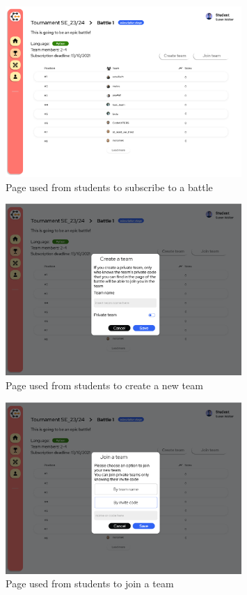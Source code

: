 \begin{figure}[H]
    \centering
    \includegraphics[width=0.8\textwidth]{Mockups/11_student_battle_subscription.png}
    \caption{Page used from students to subscribe to a battle}
\end{figure}
\begin{figure}[H]
    \centering
    \includegraphics[width=0.8\textwidth]{Mockups/12_student_create_team.png}
    \caption{Page used from students to create a new team}
\end{figure}
\begin{figure}[H]
    \centering
    \includegraphics[width=0.8\textwidth]{Mockups/13_student_join_team.png}
    \caption{Page used from students to join a team}
\end{figure}
